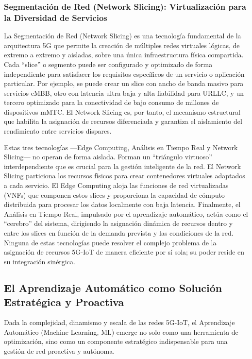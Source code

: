 \documentclass[12pt,a4paper]{article}
\begin{document}
\subsubsection{Segmentación de Red (Network Slicing): Virtualización para la Diversidad de Servicios}

La Segmentación de Red (Network Slicing) es una tecnología fundamental de la arquitectura 5G que permite la creación de múltiples redes virtuales lógicas, de extremo a extremo y aisladas, sobre una única infraestructura física compartida\cite{ref17}. Cada ``slice'' o segmento puede ser configurado y optimizado de forma independiente para satisfacer los requisitos específicos de un servicio o aplicación particular. Por ejemplo, se puede crear un slice con ancho de banda masivo para servicios eMBB, otro con latencia ultra baja y alta fiabilidad para URLLC, y un tercero optimizado para la conectividad de bajo consumo de millones de dispositivos mMTC\cite{ref29}. El Network Slicing es, por tanto, el mecanismo estructural que habilita la asignación de recursos diferenciada y garantiza el aislamiento del rendimiento entre servicios dispares.

Estas tres tecnologías —Edge Computing, Análisis en Tiempo Real y Network Slicing— no operan de forma aislada. Forman un ``triángulo virtuoso'' interdependiente que es crucial para la gestión inteligente de la red. El Network Slicing particiona los recursos físicos para crear contenedores virtuales adaptados a cada servicio. El Edge Computing aloja las funciones de red virtualizadas (VNFs) que componen estos slices y proporciona la capacidad de cómputo distribuida para procesar los datos localmente con baja latencia. Finalmente, el Análisis en Tiempo Real, impulsado por el aprendizaje automático, actúa como el ``cerebro'' del sistema, dirigiendo la asignación dinámica de recursos dentro y entre los slices en función de la demanda prevista y las condiciones de la red. Ninguna de estas tecnologías puede resolver el complejo problema de la asignación de recursos 5G-IoT de manera eficiente por sí sola; su poder reside en su integración sinérgica.

\subsection{El Aprendizaje Automático como Solución Estratégica y Proactiva}

Dada la complejidad, dinamismo y escala de las redes 5G-IoT, el Aprendizaje Automático (Machine Learning, ML) emerge no solo como una herramienta de optimización, sino como un componente estratégico indispensable para una gestión de red proactiva y autónoma.
\end{document}
